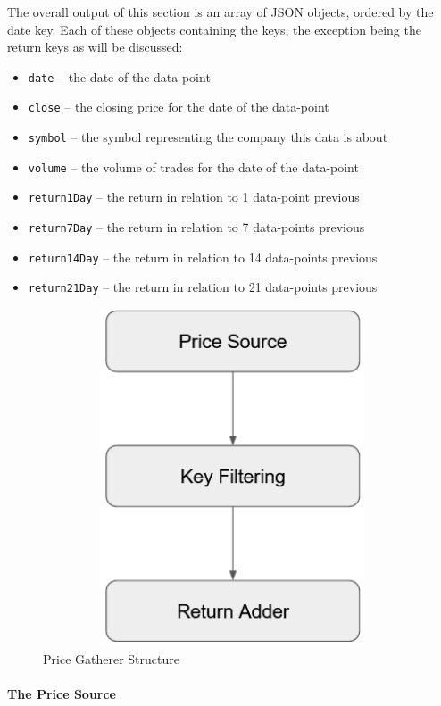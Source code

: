 The overall output of this section is an array of JSON objects, ordered by the date key. Each of these objects containing the keys, the exception being the return keys as will be discussed:
\begin{itemize}
    \item \texttt{date} -- the date of the data-point
    \item \texttt{close} -- the closing price for the date of the data-point
    \item \texttt{symbol} -- the symbol representing the company this data is about
    \item \texttt{volume} -- the volume of trades for the date of the data-point
    \item \texttt{return1Day} -- the return in relation to 1 data-point previous
    \item \texttt{return7Day} -- the return in relation to 7 data-points previous
    \item \texttt{return14Day} -- the return in relation to 14 data-points previous
    \item \texttt{return21Day} -- the return in relation to 21 data-points previous
\end{itemize}

\begin{figure}[h]
    \centering
    \includegraphics[width=15cm,height=10cm,keepaspectratio]{design/PriceGathererStructure.png}
    \caption{Price Gatherer Structure}
    \label{fig:pricegathererstructure}
\end{figure}

\paragraph{The Price Source}

